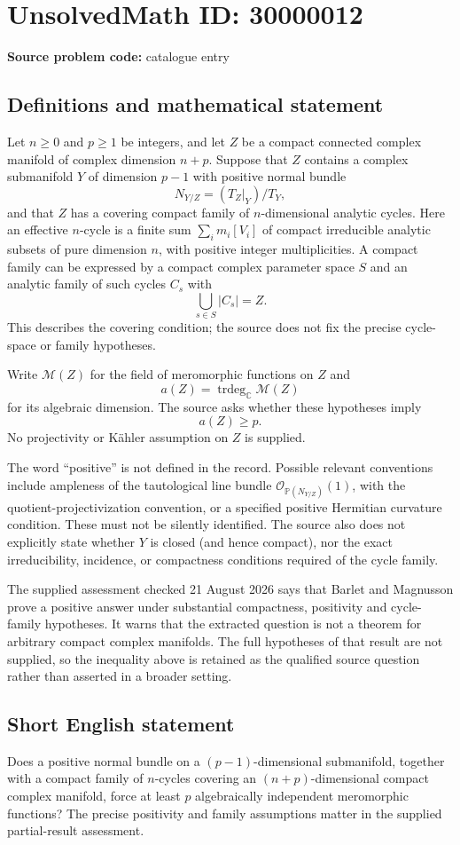 \documentclass[11pt]{article}
\newcommand{\C}{\mathbb{C}}
\newcommand{\PP}{\mathbb{P}}
\begin{document}
\section*{UnsolvedMath ID: 30000012}
\textbf{Source problem code:} catalogue entry
\subsection{Definitions and mathematical statement}
Let $n\geq0$ and $p\geq1$ be integers, and let $Z$ be a compact connected complex manifold of complex dimension $n+p$. Suppose that $Z$ contains a complex submanifold $Y$ of dimension $p-1$ with positive normal bundle
\[
 N_{Y/Z}=(T_Z|_Y)/T_Y,
\]
and that $Z$ has a covering compact family of $n$-dimensional analytic cycles. Here an effective $n$-cycle is a finite sum $\sum_i m_i[V_i]$ of compact irreducible analytic subsets of pure dimension $n$, with positive integer multiplicities. A compact family can be expressed by a compact complex parameter space $S$ and an analytic family of such cycles $C_s$ with
\[
 \bigcup_{s\in S}|C_s|=Z.
\]
This describes the covering condition; the source does not fix the precise cycle-space or family hypotheses.

Write $\mathcal M(Z)$ for the field of meromorphic functions on $Z$ and
\[
 a(Z)=\operatorname{trdeg}_{\C}\mathcal M(Z)
\]
for its algebraic dimension. The source asks whether these hypotheses imply
\[
 a(Z)\geq p.
\]
No projectivity or K\"ahler assumption on $Z$ is supplied.

The word ``positive'' is not defined in the record. Possible relevant conventions include ampleness of the tautological line bundle $\mathcal O_{\PP(N_{Y/Z})}(1)$, with the quotient-projectivization convention, or a specified positive Hermitian curvature condition. These must not be silently identified. The source also does not explicitly state whether $Y$ is closed (and hence compact), nor the exact irreducibility, incidence, or compactness conditions required of the cycle family.

The supplied assessment checked 21 August 2026 says that Barlet and Magnusson prove a positive answer under substantial compactness, positivity and cycle-family hypotheses. It warns that the extracted question is not a theorem for arbitrary compact complex manifolds. The full hypotheses of that result are not supplied, so the inequality above is retained as the qualified source question rather than asserted in a broader setting.
\subsection{Short English statement}
Does a positive normal bundle on a $(p-1)$-dimensional submanifold, together with a compact family of $n$-cycles covering an $(n+p)$-dimensional compact complex manifold, force at least $p$ algebraically independent meromorphic functions? The precise positivity and family assumptions matter in the supplied partial-result assessment.
\end{document}
